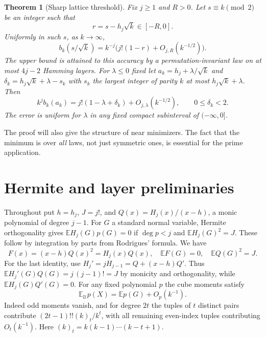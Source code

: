 \documentclass[11pt]{article}
\newtheorem{theorem}{Theorem}[section]
\theoremstyle{remark}\newtheorem{remark}[theorem]{Remark}
\newcommand{\E}{\mathbb E}
\newcommand{\U}{\mathcal U}
\begin{document}
\begin{theorem}[Sharp lattice threshold]\label{thm:main}
Fix $j\ge1$ and $R>0$. Let $s\equiv k\pmod2$ be an integer such that
\[
 r=s-h_j\sqrt{k}\in[-R,0].
\]
Uniformly in such $s$, as $k\to\infty$,
\begin{equation}\label{eq:main}
 b_k(s/\sqrt{k})=k^{-j}\bigl(j!(1-r)+O_{j,R}(k^{-1/2})\bigr).
\end{equation}
The upper bound is attained to this accuracy by a permutation-invariant law on at most $4j-2$ Hamming layers. For $\lambda\le0$ fixed let $a_k=h_j+\lambda/\sqrt{k}$ and $\delta_k= h_j\sqrt{k}+\lambda-s_k$ with $s_k$ the largest integer of parity $k$ at most $h_j\sqrt{k}+\lambda$. Then
\begin{equation}\label{eq:window}
 k^j b_k(a_k)=j!(1-\lambda+\delta_k)+O_{j,\lambda}(k^{-1/2}),\qquad 0\le\delta_k<2.
\end{equation}
The error is uniform for $\lambda$ in any fixed compact subinterval of $(-\infty,0]$.
\end{theorem}

The proof will also give the structure of near minimizers. The fact that the minimum is over \emph{all} laws, not just symmetric ones, is essential for the prime application.

\section{Hermite and layer preliminaries}
Throughout put $h=h_j$, $J=j!$, and $Q(x)=H_j(x)/(x-h)$, a monic polynomial of degree $j-1$. For $G$ a standard normal variable, Hermite orthogonality gives $\E H_j(G)p(G)=0$ if $\deg p<j$ and $\E H_j(G)^2=J$. These follow by integration by parts from Rodrigues' formula. We have
\begin{equation}\label{eq:hermite}
 F(x)=(x-h)Q(x)^2=H_j(x)Q(x),\quad \E F(G)=0,\quad \E Q(G)^2=J.
\end{equation}
For the last identity, use $H_j'=jH_{j-1}=Q+(x-h)Q'$. Thus $\E H_j'(G)Q(G)=j\,(j-1)!=J$ by monicity and orthogonality, while $\E H_j(G)Q'(G)=0$. For any fixed polynomial $p$ the cube moments satisfy
\begin{equation}\label{eq:moment}
 \E_\U p(X)=\E p(G)+O_p(k^{-1}).
\end{equation}
Indeed odd moments vanish, and for degree $2t$ the tuples of $t$ distinct pairs contribute $(2t-1)!!(k)_t/k^t$, with all remaining even-index tuples contributing $O_t(k^{-1})$. Here $(k)_t=k(k-1)\cdots(k-t+1)$.
\end{document}
